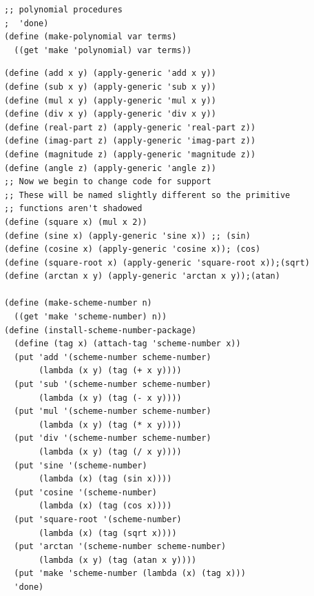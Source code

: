 \documentclass[final,fleqn,titlepage,twoside]{article}
\begin{document}
\begin{verbatim}
;; polynomial procedures
;  'done)
(define (make-polynomial var terms)
  ((get 'make 'polynomial) var terms))
\end{verbatim}
\begin{verbatim}
(define (add x y) (apply-generic 'add x y))
(define (sub x y) (apply-generic 'sub x y))
(define (mul x y) (apply-generic 'mul x y))
(define (div x y) (apply-generic 'div x y))
(define (real-part z) (apply-generic 'real-part z))
(define (imag-part z) (apply-generic 'imag-part z))
(define (magnitude z) (apply-generic 'magnitude z))
(define (angle z) (apply-generic 'angle z))
;; Now we begin to change code for support
;; These will be named slightly different so the primitive
;; functions aren't shadowed
(define (square x) (mul x 2))
(define (sine x) (apply-generic 'sine x)) ;; (sin)
(define (cosine x) (apply-generic 'cosine x)); (cos)
(define (square-root x) (apply-generic 'square-root x));(sqrt)
(define (arctan x y) (apply-generic 'arctan x y));(atan)

(define (make-scheme-number n)
  ((get 'make 'scheme-number) n))
(define (install-scheme-number-package)
  (define (tag x) (attach-tag 'scheme-number x))
  (put 'add '(scheme-number scheme-number)
       (lambda (x y) (tag (+ x y))))
  (put 'sub '(scheme-number scheme-number)
       (lambda (x y) (tag (- x y))))
  (put 'mul '(scheme-number scheme-number)
       (lambda (x y) (tag (* x y))))
  (put 'div '(scheme-number scheme-number)
       (lambda (x y) (tag (/ x y))))
  (put 'sine '(scheme-number)
       (lambda (x) (tag (sin x))))
  (put 'cosine '(scheme-number)
       (lambda (x) (tag (cos x))))
  (put 'square-root '(scheme-number)
       (lambda (x) (tag (sqrt x))))
  (put 'arctan '(scheme-number scheme-number)
       (lambda (x y) (tag (atan x y))))
  (put 'make 'scheme-number (lambda (x) (tag x)))
  'done)


\end{verbatim}
\end{document}
